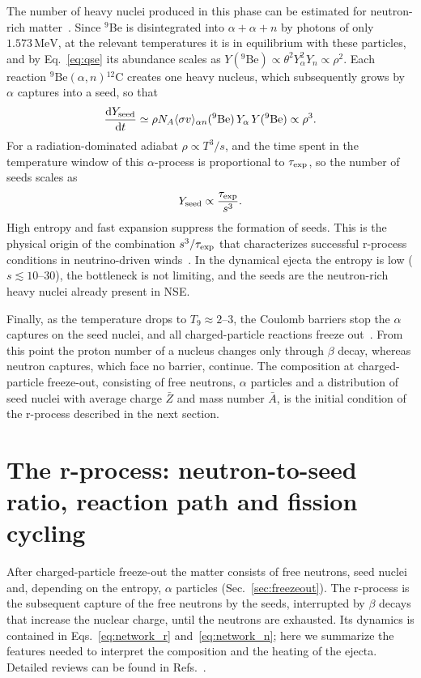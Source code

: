 The number of heavy nuclei produced in this phase can be estimated for neutron-rich matter~\cite{hoffman_nucleosynthesis_1997}.
Since ${}^9$Be is disintegrated into $\alpha+\alpha+n$ by photons of only $1.573\,\mathrm{MeV}$, at the relevant temperatures it is in equilibrium with these particles, and by Eq.~\ref{eq:qse} its abundance scales as $Y({}^9\mathrm{Be})\propto\theta^2Y_\alpha^2Y_n\propto\rho^2$.
Each reaction ${}^9\mathrm{Be}(\alpha,n){}^{12}\mathrm{C}$ creates one heavy nucleus, which subsequently grows by $\alpha$ captures into a seed, so that
\begin{equation}\label{eq:seed_rate}
  \frac{\mathrm{d}Y_{\rm seed}}{\mathrm{d}t}\simeq\rho N_A\langle\sigma v\rangle_{\alpha n}({}^9\mathrm{Be})\,Y_\alpha\,Y({}^9\mathrm{Be})\propto\rho^3 .
\end{equation}
For a radiation-dominated adiabat $\rho\propto T^3/s$, and the time spent in the temperature window of this $\alpha$-process is proportional to $\tau_{\rm exp}$, so the number of seeds scales as
\begin{equation}\label{eq:seed_scaling}
  Y_{\rm seed}\propto\frac{\tau_{\rm exp}}{s^3}.
\end{equation}
High entropy and fast expansion suppress the formation of seeds.
This is the physical origin of the combination $s^3/\tau_{\rm exp}$ that characterizes successful r-process conditions in neutrino-driven winds~\cite{hoffman_nucleosynthesis_1997}.
In the dynamical ejecta the entropy is low ($s\lesssim10$--$30$), the bottleneck is not limiting, and the seeds are the neutron-rich heavy nuclei already present in NSE.
 
Finally, as the temperature drops to $T_9\approx2$--$3$, the Coulomb barriers stop the $\alpha$ captures on the seed nuclei, and all charged-particle reactions freeze out~\cite{woosley_alpha_1992,qian_origin_2003}.
From this point the proton number of a nucleus changes only through $\beta$ decay, whereas neutron captures, which face no barrier, continue.
The composition at charged-particle freeze-out, consisting of free neutrons, $\alpha$ particles and a distribution of seed nuclei with average charge $\bar Z$ and mass number $\bar A$, is the initial condition of the r-process described in the next section.

\section{The r-process: neutron-to-seed ratio, reaction path and fission cycling}\label{sec:rprocess}
After charged-particle freeze-out the matter consists of free neutrons, seed nuclei and, depending on the entropy, $\alpha$ particles (Sec.~\ref{sec:freezeout}).
The r-process is the subsequent capture of the free neutrons by the seeds, interrupted by $\beta$ decays that increase the nuclear charge, until the neutrons are exhausted.
Its dynamics is contained in Eqs.~\ref{eq:network_r} and~\ref{eq:network_n}; here we summarize the features needed to interpret the composition and the heating of the ejecta.
Detailed reviews can be found in Refs.~\cite{cowan_r-process_1991,arnould_r-process_2007,cowan_origin_2021}.

